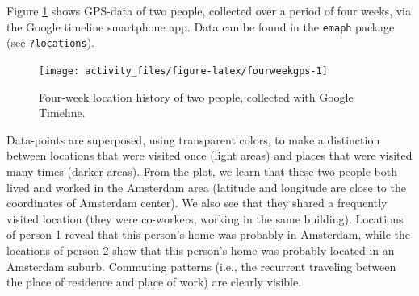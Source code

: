 \documentclass[]{book}
\newenvironment{Shaded}{\begin{snugshade}}{\end{snugshade}}
\newcommand{\KeywordTok}[1]{\textcolor[rgb]{0.13,0.29,0.53}{\textbf{#1}}}
\newcommand{\DataTypeTok}[1]{\textcolor[rgb]{0.13,0.29,0.53}{#1}}
\newcommand{\DecValTok}[1]{\textcolor[rgb]{0.00,0.00,0.81}{#1}}
\newcommand{\FloatTok}[1]{\textcolor[rgb]{0.00,0.00,0.81}{#1}}
\newcommand{\StringTok}[1]{\textcolor[rgb]{0.31,0.60,0.02}{#1}}
\newcommand{\CommentTok}[1]{\textcolor[rgb]{0.56,0.35,0.01}{\textit{#1}}}
\newcommand{\OperatorTok}[1]{\textcolor[rgb]{0.81,0.36,0.00}{\textbf{#1}}}
\newcommand{\NormalTok}[1]{#1}
\begin{document}
Figure \ref{fig:fourweekgps} shows GPS-data of two people, collected
over a period of four weeks, via the Google timeline smartphone app.
Data can be found in the \texttt{emaph} package (see
\texttt{?locations}).

\begin{Shaded}
\end{Shaded}

\begin{figure}

{\centering \texttt{[image: activity\_files/figure-latex/fourweekgps-1]} 

}

\caption{Four-week location history of two people, collected with Google Timeline.}\label{fig:fourweekgps}
\end{figure}

Data-points are superposed, using transparent colors, to make a
distinction between locations that were visited once (light areas) and
places that were visited many times (darker areas). From the plot, we
learn that these two people both lived and worked in the Amsterdam area
(latitude and longitude are close to the coordinates of Amsterdam
center). We also see that they shared a frequently visited location
(they were co-workers, working in the same building). Locations of
person 1 reveal that this person's home was probably in Amsterdam, while
the locations of person 2 show that this person's home was probably
located in an Amsterdam suburb. Commuting patterns (i.e., the recurrent
traveling between the place of residence and place of work) are clearly
visible.
\end{document}
